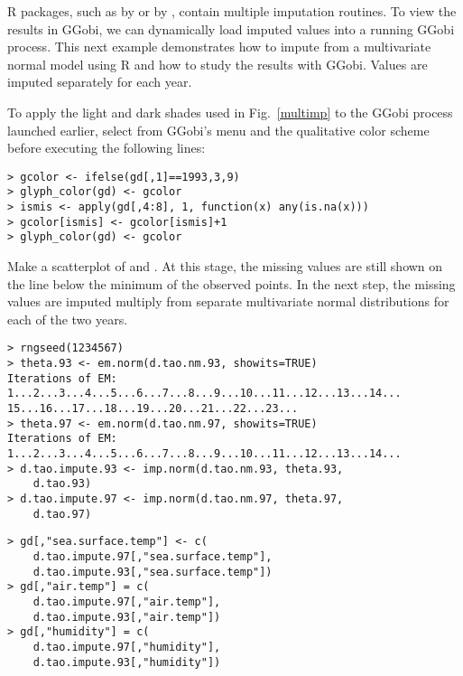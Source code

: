 
R packages, such as  by  or
 by , contain multiple imputation
routines.  To view the results in GGobi, we can dynamically load
imputed values into a running GGobi process.  This next example
demonstrates how to impute from a multivariate normal model using R
and how to study the results with GGobi. Values are imputed separately
for each year.

To apply the light and dark shades used in Fig.~\ref{multimp} to the
GGobi process launched earlier, select  from
GGobi's  menu and the  qualitative
color scheme before executing the following lines:

\begin{verbatim}
> gcolor <- ifelse(gd[,1]==1993,3,9)
> glyph_color(gd) <- gcolor
> ismis <- apply(gd[,4:8], 1, function(x) any(is.na(x)))
> gcolor[ismis] <- gcolor[ismis]+1
> glyph_color(gd) <- gcolor
\end{verbatim}

\noindent Make a scatterplot of  and 
. At this stage, the missing values are still 
shown on the line below the minimum of the observed points.  In the
next step, the missing values are imputed multiply from separate
multivariate normal distributions for each of the two years.

\begin{verbatim}
> rngseed(1234567) 
> theta.93 <- em.norm(d.tao.nm.93, showits=TRUE)
Iterations of EM: 
1...2...3...4...5...6...7...8...9...10...11...12...13...14...
15...16...17...18...19...20...21...22...23...
> theta.97 <- em.norm(d.tao.nm.97, showits=TRUE)
Iterations of EM: 
1...2...3...4...5...6...7...8...9...10...11...12...13...14...
> d.tao.impute.93 <- imp.norm(d.tao.nm.93, theta.93,
    d.tao.93)
> d.tao.impute.97 <- imp.norm(d.tao.nm.97, theta.97,
    d.tao.97)
\end{verbatim}
\newpage
\begin{verbatim}
> gd[,"sea.surface.temp"] <- c(
    d.tao.impute.97[,"sea.surface.temp"],
    d.tao.impute.93[,"sea.surface.temp"])
> gd[,"air.temp"] = c(
    d.tao.impute.97[,"air.temp"],
    d.tao.impute.93[,"air.temp"])
> gd[,"humidity"] = c(
    d.tao.impute.97[,"humidity"],
    d.tao.impute.93[,"humidity"])
\end{verbatim}

